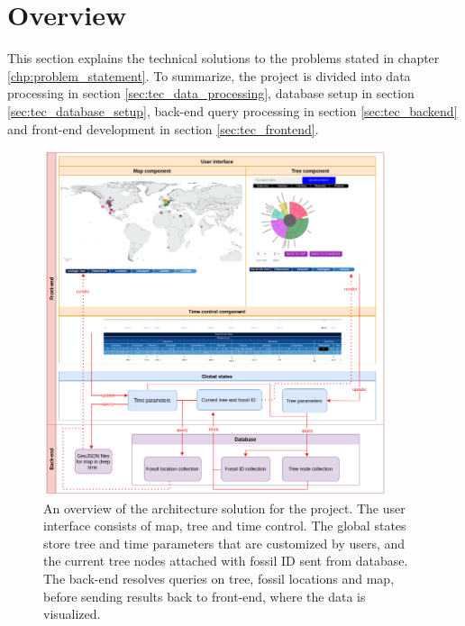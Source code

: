 \documentclass[11pt, a4paper,oneside,chapterprefix=false]{scrbook}
\begin{document}
\section{Overview}\label{sec:tec_overview}
This section explains the technical solutions to the problems stated in chapter \ref{chp:problem_statement}. To summarize, the project is divided into data processing in section \ref{sec:tec_data_processing}, database setup in section \ref{sec:tec_database_setup}, back-end query processing in section \ref{sec:tec_backend} and front-end development in section \ref{sec:tec_frontend}.

\begin{figure}[h]
	\centering
	\includegraphics[width=0.9\textwidth]{figures/technical_solution/architecture}
	\caption{An overview of the architecture solution for the project. The user interface consists of map, tree and time control. The global states store tree and time parameters that are customized by users, and the current tree nodes attached with fossil ID sent from database. The back-end resolves queries on tree, fossil locations and map, before sending results back to front-end, where the data is visualized. }
	\label{fig:architecture}
\end{figure}
\end{document}
